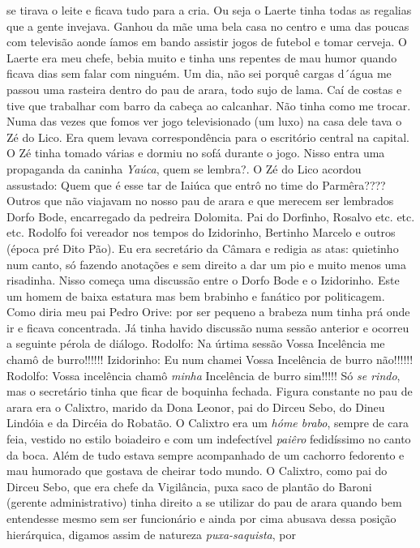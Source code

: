 \documentclass[12pt,brazil,]{book}
\begin{document}
se tirava o leite e ficava tudo para a cria. Ou seja o Laerte tinha
todas as regalias que a gente invejava. Ganhou da mãe uma bela casa no
centro e uma das poucas com televisão aonde íamos em bando assistir
jogos de futebol e tomar cerveja. O Laerte era meu chefe, bebia muito e
tinha uns repentes de mau humor quando ficava dias sem falar com
ninguém. Um dia, não sei porquê cargas d´água me passou uma rasteira
dentro do pau de arara, todo sujo de lama. Caí de costas e tive que
trabalhar com barro da cabeça ao calcanhar. Não tinha como me trocar.
Numa das vezes que fomos ver jogo televisionado (um luxo) na casa dele
tava o Zé do Lico. Era quem levava correspondência para o escritório
central na capital. O Zé tinha tomado várias e dormiu no sofá durante o
jogo. Nisso entra uma propaganda da caninha \emph{Yaúca}, quem se
lembra?. O Zé do Lico acordou assustado: Quem que é esse tar de Iaiúca
que entrô no time do Parmêra???? Outros que não viajavam no nosso pau de
arara e que merecem ser lembrados Dorfo Bode, encarregado da pedreira
Dolomita. Pai do Dorfinho, Rosalvo etc. etc. etc. Rodolfo foi vereador
nos tempos do Izidorinho, Bertinho Marcelo e outros (época pré Dito
Pão). Eu era secretário da Câmara e redigia as atas: quietinho num
canto, só fazendo anotações e sem direito a dar um pio e muito menos uma
risadinha. Nisso começa uma discussão entre o Dorfo Bode e o Izidorinho.
Este um homem de baixa estatura mas bem brabinho e fanático por
politicagem. Como diria meu pai Pedro Orive: por ser pequeno a brabeza
num tinha prá onde ir e ficava concentrada. Já tinha havido discussão
numa sessão anterior e ocorreu a seguinte pérola de diálogo. Rodolfo: Na
úrtima sessão Vossa Incelência me chamô de burro!!!!!! Izidorinho: Eu
num chamei Vossa Incelência de burro não!!!!!! Rodolfo: Vossa incelência
chamô \emph{minha} Incelência de burro sim!!!!! Só \emph{se rindo}, mas
o secretário tinha que ficar de boquinha fechada. Figura constante no
pau de arara era o Calixtro, marido da Dona Leonor, pai do Dirceu Sebo,
do Dineu Lindóia e da Dircéia do Robatão. O Calixtro era um \emph{hóme
brabo}, sempre de cara feia, vestido no estilo boiadeiro e com um
indefectível \emph{paiêro} fedidíssimo no canto da boca. Além de tudo
estava sempre acompanhado de um cachorro fedorento e mau humorado que
gostava de cheirar todo mundo. O Calixtro, como pai do Dirceu Sebo, que
era chefe da Vigilância, puxa saco de plantão do Baroni (gerente
administrativo) tinha direito a se utilizar do pau de arara quando bem
entendesse mesmo sem ser funcionário e ainda por cima abusava dessa
posição hierárquica, digamos assim de natureza \emph{puxa-saquista}, por
\end{document}
